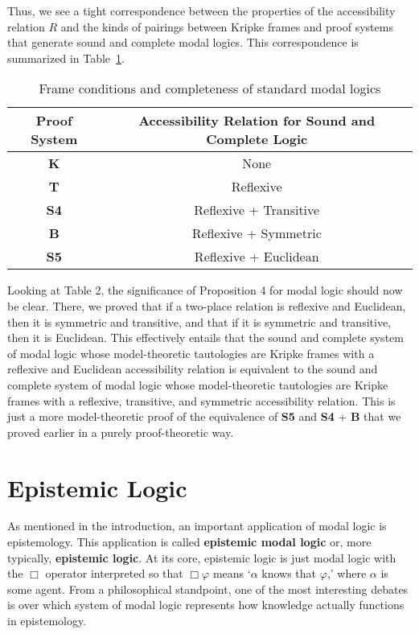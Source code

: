 \documentclass[11pt]{article}
\theoremstyle{definition}
\theoremstyle{remark}
\begin{document}
\noindent
Thus, we see a tight correspondence between the properties of the accessibility relation $R$ and the kinds of pairings between Kripke frames and proof systems that generate sound and complete modal logics. This correspondence is summarized in Table~\ref{tab:accessibility}.\par 
\begin{table}[]
\centering
\begin{tabular}{|c|c|}
\hline
\textbf{Proof System} & \textbf{Accessibility Relation for Sound and Complete Logic} \\
\hline
\textbf{K}   & None  \\
\textbf{T}   & Reflexive        \\
\textbf{S4}  & Reflexive + Transitive  \\
\textbf{B}   & Reflexive + Symmetric \\
\textbf{S5}  & Reflexive + Euclidean  \\
\hline
\end{tabular}
\caption{Frame conditions and completeness of standard modal logics}\label{tab:accessibility}
\end{table}


Looking at Table 2, the significance of Proposition 4 for modal logic should now be clear. There, we proved that if a two-place relation is reflexive and Euclidean, then it is symmetric and transitive, and that if it is symmetric and transitive, then it is Euclidean. This effectively entails that the sound and complete system of modal logic whose model-theoretic tautologies are Kripke frames with a reflexive and Euclidean accessibility relation is equivalent to the sound and complete system of modal logic whose model-theoretic tautologies are Kripke frames with a reflexive, transitive, and symmetric accessibility relation. This is just a more model-theoretic proof of the equivalence of  \textbf{S5} and \textbf{S4} + \textbf{B} that we proved earlier in a purely proof-theoretic way.\par 



\section{Epistemic Logic}
As mentioned in the introduction, an important application of modal logic is epistemology. This application is called \textbf{epistemic modal logic} or, more typically, \textbf{epistemic logic}. At its core, epistemic logic is just modal logic with the $\Box$ operator interpreted so that $\Box\varphi$ means `$\alpha$ knows that $\varphi$,' where $\alpha$ is some agent. From a philosophical standpoint, one of the most interesting debates is over which system of modal logic represents how knowledge actually functions in epistemology.\par 
\end{document}
